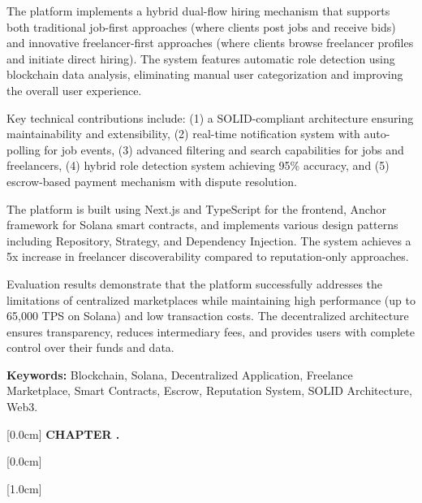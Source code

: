 \documentclass[a4paper,13pt,twoside]{report}
\theoremstyle{definition}
\begin{document}
The platform implements a hybrid dual-flow hiring mechanism that supports both traditional job-first approaches (where clients post jobs and receive bids) and innovative freelancer-first approaches (where clients browse freelancer profiles and initiate direct hiring). The system features automatic role detection using blockchain data analysis, eliminating manual user categorization and improving the overall user experience.

Key technical contributions include: (1) a SOLID-compliant architecture ensuring maintainability and extensibility, (2) real-time notification system with auto-polling for job events, (3) advanced filtering and search capabilities for jobs and freelancers, (4) hybrid role detection system achieving 95\% accuracy, and (5) escrow-based payment mechanism with dispute resolution.

The platform is built using Next.js and TypeScript for the frontend, Anchor framework for Solana smart contracts, and implements various design patterns including Repository, Strategy, and Dependency Injection. The system achieves a 5x increase in freelancer discoverability compared to reputation-only approaches.

Evaluation results demonstrate that the platform successfully addresses the limitations of centralized marketplaces while maintaining high performance (up to 65,000 TPS on Solana) and low transaction costs. The decentralized architecture ensures transparency, reduces intermediary fees, and provides users with complete control over their funds and data.

\vspace{0.5cm}

\textbf{Keywords:} Blockchain, Solana, Decentralized Application, Freelance Marketplace, Smart Contracts, Escrow, Reputation System, SOLID Architecture, Web3.

\newpage
\renewcommand*\contentsname{TABLE OF CONTENTS}

    [0.0cm]
    {\bfseries\vspace{0.3cm}}
    {{\bfseries{\scshape} CHAPTER \thecontentslabel.\ }}
    {}
    {\contentspage}

    [0.0cm]
    {\vspace{0.3cm}}
    {\thecontentslabel \ }
    {}
    {\contentspage}

    [1.0cm]
    {\vspace{0.3cm}}
    {\thecontentslabel \ }
    {}
    {\contentspage}
\end{document}
